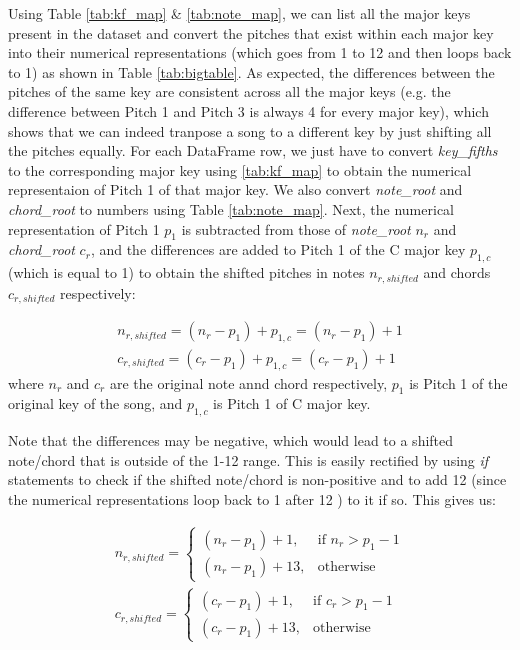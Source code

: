 Using Table \ref{tab:kf_map} \& \ref{tab:note_map}, we can list all the major keys present in the dataset and convert the pitches that exist within each major key into their numerical representations (which goes from 1 to 12 and then loops back to 1) as shown in Table \ref{tab:bigtable}. As expected, the differences between the pitches of the same key are consistent across all the major keys (e.g. the difference between Pitch 1 and Pitch 3 is always 4 for every major key), which shows that we can indeed tranpose a song to a different key by just shifting all the pitches equally. For each DataFrame row, we just have to convert \emph{key\_fifths} to the corresponding major key using \ref{tab:kf_map} to obtain the numerical representaion of Pitch 1 of that major key. We also convert \emph{note\_root} and \emph{chord\_root} to numbers using Table \ref{tab:note_map}. Next, the numerical representation of Pitch 1 $p_1$ is subtracted from those of \emph{note\_root} $n_r$ and \emph{chord\_root} $c_r$, and the differences are added to Pitch 1 of the C major key $p_{1,c}$ (which is equal to 1) to obtain the shifted pitches in notes $n_{r,shifted}$ and chords $c_{r,shifted}$ respectively: 

\begin{align} 
    \label{shift note 1}
    n_{r,shifted} = (n_r-p_1)+p_{1,c} = (n_r-p_1)+1\\
    \label{shift chord 2}
    c_{r,shifted} =(c_r-p_1)+p_{1,c} = (c_r-p_1)+1
\end{align}
where $n_r$ and $c_r$ are the original note annd chord respectively, $p_1$ is Pitch 1 of the original key of the song, and $p_{1,c}$ is Pitch 1 of C major key.

Note that the differences may be negative, which would lead to a shifted note/chord that is outside of the 1-12 range. This is easily rectified by using \emph{if} statements to check if the shifted note/chord is non-positive and to add 12 (since the numerical representations loop back to 1 after 12 ) to it if so. This gives us:

\begin{align}
    \label{shift note 2}
    n_{r,shifted}= 
\begin{cases}
    (n_r-p_1)+1,& \text{if } n_r > p_1-1\\
    (n_r-p_1)+13,              & \text{otherwise}
\end{cases}\\
c_{r,shifted}= 
\begin{cases}
    (c_r-p_1)+1,& \text{if } c_r > p_1-1\\
    (c_r-p_1)+13,              & \text{otherwise}
\end{cases}
\end{align}

